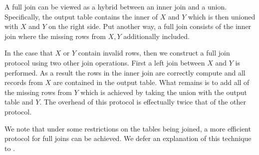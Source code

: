 A full join can be viewed as a hybrid between an inner join and a union. Specifically, the output table contains the inner of $X$ and $Y$ which is then unioned with $X$ and $Y$ on the right side. Put another way, a full join consists of the inner join where the missing rows from $X,Y$ additionally included. 

In the case that $X$ or $Y$ contain invalid rows, then we construct a full join protocol using two other join operations. First a left join between $X$ and $Y$ is performed. As a result the rows in the inner join are correctly compute and all records from $X$ are contained in the output table. What remains is to add all of the missing rows from $Y$ which is achieved by taking the union with the output table and $Y$. The overhead of this protocol is effectually twice that of the other protocol.

We note that under some restrictions on the tables being joined, a more efficient protocol for full joins can be achieved. We defer an explanation of this technique to .

%
%
%
%
%
%


